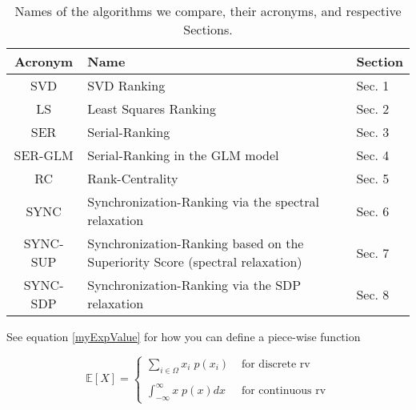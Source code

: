 \documentclass[11pt]{article}
\begin{document}
\begin{table}[tpb]
\begin{minipage}[b]{0.99\linewidth}
\begin{center}
\begin{tabular}{|c|l|l|}
\hline
 Acronym & Name & Section \\
\hline
SVD 		&  SVD  Ranking &  Sec. 1  \\
LS 		& Least Squares Ranking & Sec. 2 \\
SER 		& Serial-Ranking &  Sec. 3  \\
SER-GLM 		& Serial-Ranking in the GLM model &  Sec. 4 \\
RC 			& Rank-Centrality &  Sec. 5  \\
SYNC & Synchronization-Ranking via the spectral relaxation &  Sec. 6 \\
SYNC-SUP		& Synchronization-Ranking based on the Superiority Score (spectral relaxation) &  Sec. 7 \\
SYNC-SDP 	& Synchronization-Ranking via the SDP relaxation & Sec. 8  \\
\hline
\end{tabular}
\end{center}
\end{minipage} 
\caption{Names of the algorithms we compare, their acronyms, and respective Sections.}
\label{tab:methodAbbrev}
\end{table}

\vspace{20mm}

See equation \ref{myExpValue} for how you can define a piece-wise function

\begin{equation}
\mathbb{E}[X] = \left\{
	\begin{array}{rl}
\sum_{i \in \Omega} x_i \; p(x_i) & \text{ for discrete rv} 	\\
 &  \\
 \int_{-\infty}^{\infty} x \; p(x) dx & \text{ for continuous rv}	
     \end{array}
   \right.
\label{myExpValue}
\end{equation}
\end{document}
